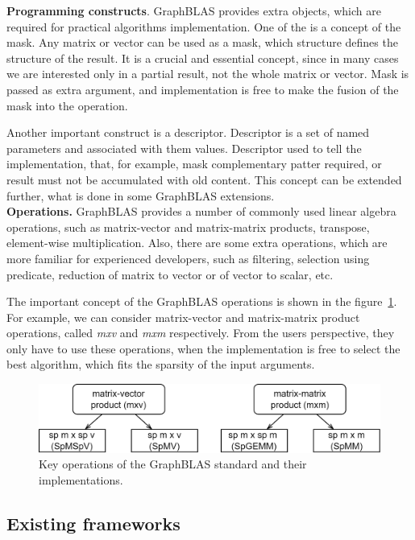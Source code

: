 \textbf{Programming constructs}. GraphBLAS provides extra objects, which are required for practical algorithms implementation. One of the is a concept of the mask. Any matrix or vector can be used as a mask, which structure defines the structure of the result. It is a crucial and essential concept, since in many cases we are interested only in a partial result, not the whole matrix or vector. Mask is passed as extra argument, and implementation is free to make the fusion of the mask into the operation.

Another important construct is a descriptor. Descriptor is a set of named parameters and associated with them values. Descriptor used to tell the implementation, that, for example, mask complementary patter required, or result must not be accumulated with old content. This concept can be extended further, what is done in some GraphBLAS extensions.\\

\textbf{Operations.} GraphBLAS provides a number of commonly used linear algebra operations, such as matrix-vector and matrix-matrix products, transpose, element-wise multiplication. Also, there are some extra operations, which are more familiar for experienced developers, such as filtering, selection using predicate, reduction of matrix to vector or of vector to scalar, etc.

The important concept of the GraphBLAS operations is shown in the figure~\ref{fig:gb_ops}. For example, we can consider matrix-vector and matrix-matrix product operations, called \textit{mxv} and \textit{mxm} respectively. From the users perspective, they only have to use these operations, when the implementation is free to select the best algorithm, which fits the sparsity of the input arguments. 

\begin{figure}[h]
    \centering
    \includegraphics[width=1.0\textwidth]{images/types_of_operations.png}
    \caption{Key operations of the GraphBLAS standard and their implementations.}
    \label{fig:gb_ops}
\end{figure}

\subsection{Existing frameworks}

